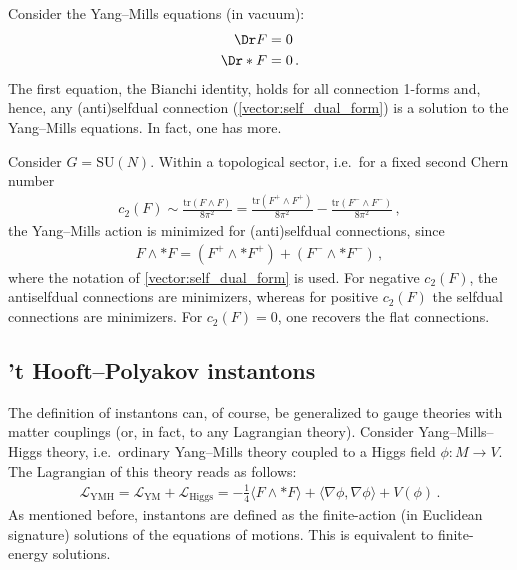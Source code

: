     Consider the Yang--Mills equations (in vacuum):
    \begin{align*}
        \Dr F &= 0\\
        \Dr\ast F &= 0\,.
    \end{align*}
    The first equation, the Bianchi identity, holds for all connection 1-forms and, hence, any (anti)selfdual connection (\cref{vector:self_dual_form}) is a solution to the Yang--Mills equations. In fact, one has more.
    \begin{property}[Minimizers]
        Consider $G=\mathrm{SU}(N)$. Within a topological sector, i.e.~for a fixed second Chern number
        \begin{gather}
            c_2(F) \sim \frac{\mathrm{tr}(F\wedge F)}{8\pi^2} = \frac{\mathrm{tr}(F^+\wedge F^+)}{8\pi^2} - \frac{\mathrm{tr}(F^-\wedge F^-)}{8\pi^2}\,,
        \end{gather}
        the Yang--Mills action is minimized for (anti)selfdual connections, since
        \begin{gather*}
            F\wedge\ast F = (F^+\wedge\ast F^+)+(F^-\wedge\ast F^-)\,,
        \end{gather*}
        where the notation of \cref{vector:self_dual_form} is used. For negative $c_2(F)$, the antiselfdual connections are minimizers, whereas for positive $c_2(F)$ the selfdual connections are minimizers. For $c_2(F)=0$, one recovers the flat connections.
    \end{property}

\subsection{'t Hooft--Polyakov instantons}

    The definition of instantons can, of course, be generalized to gauge theories with matter couplings (or, in fact, to any Lagrangian theory). Consider Yang--Mills--Higgs theory, i.e.~ordinary Yang--Mills theory coupled to a Higgs field $\phi:M\rightarrow V$. The Lagrangian of this theory reads as follows:
    \begin{gather}
        \mathcal{L}_{\text{YMH}} = \mathcal{L}_{\text{YM}} + \mathcal{L}_{\text{Higgs}} = -\frac{1}{4}\langle F\wedge\ast F\rangle + \langle\nabla\phi,\nabla\phi\rangle + V(\phi)\,.
    \end{gather}
    As mentioned before, instantons are defined as the finite-action (in Euclidean signature) solutions of the equations of motions. This is equivalent to finite-energy solutions.

